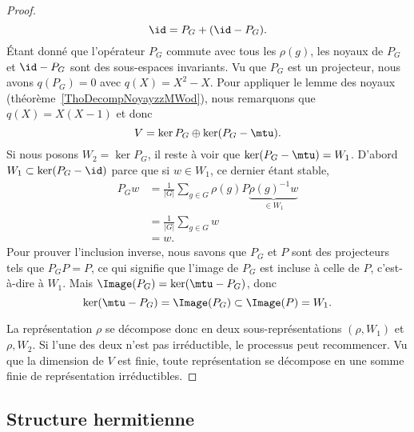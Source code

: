 \begin{proof}
\begin{equation}
		\id=P_G+(\id-P_G).
	\end{equation}
	Étant donné que l'opérateur \( P_G\) commute avec tous les \( \rho(g)\), les noyaux de \( P_G\) et \( \id-P_G\) sont des sous-espaces invariants. Vu que \( P_G\) est un projecteur, nous avons \( q(P_G)=0\) avec \( q(X)=X^2-X\). Pour appliquer le lemme des noyaux (théorème~\ref{ThoDecompNoyayzzMWod}), nous remarquons que \( q(X)=X(X-1)\) et donc
	\begin{equation}
		V=\ker P_G\oplus\ker(P_G-\mtu).
	\end{equation}
	Si nous posons \( W_2=\ker P_G\), il reste à voir que \( \ker(P_G-\mtu)=W_1\). D'abord \( W_1\subset\ker(P_G-\id)\) parce que si \( w\in W_1\), ce dernier étant stable,
	\begin{subequations}
		\begin{align}
			P_Gw & =\frac{1}{ | G | }\sum_{g\in G}\rho(g)P\underbrace{\rho(g)^{-1}w}_{\in W_1} \\
			     & =\frac{1}{ | G | }\sum_{g\in G}w                                            \\
			     & =w.
		\end{align}
	\end{subequations}
	Pour prouver l'inclusion inverse, nous savons que \( P_G\) et \( P\) sont des projecteurs tels que \( P_GP=P\), ce qui signifie que l'image de \( P_G\) est incluse à celle de \( P\), c'est-à-dire à \( W_1\). Mais \( \Image(P_G)=\ker(\mtu-P_G)\), donc
	\begin{equation}
		\ker(\mtu-P_G)=\Image(P_G)\subset\Image(P)=W_1.
	\end{equation}

	La représentation \( \rho\) se décompose donc en deux sous-représentations \( (\rho,W_1)\) et \( \rho,W_2\). Si l'une des deux n'est pas irréductible, le processus peut recommencer. Vu que la dimension de \( V\) est finie, toute représentation se décompose en une somme finie de représentation irréductibles.
\end{proof}

\subsection{Structure hermitienne}

